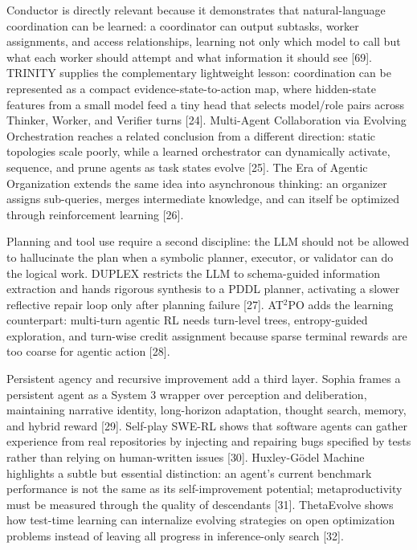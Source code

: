 \documentclass[
  11pt,
]{article}
\begin{document}
Conductor is directly relevant because it demonstrates that
natural-language coordination can be learned: a coordinator can output
subtasks, worker assignments, and access relationships, learning not
only which model to call but what each worker should attempt and what
information it should see {[}69{]}. TRINITY supplies the complementary
lightweight lesson: coordination can be represented as a compact
evidence-state-to-action map, where hidden-state features from a small
model feed a tiny head that selects model/role pairs across Thinker,
Worker, and Verifier turns {[}24{]}. Multi-Agent Collaboration via
Evolving Orchestration reaches a related conclusion from a different
direction: static topologies scale poorly, while a learned orchestrator
can dynamically activate, sequence, and prune agents as task states
evolve {[}25{]}. The Era of Agentic Organization extends the same idea
into asynchronous thinking: an organizer assigns sub-queries, merges
intermediate knowledge, and can itself be optimized through
reinforcement learning {[}26{]}.

Planning and tool use require a second discipline: the LLM should not be
allowed to hallucinate the plan when a symbolic planner, executor, or
validator can do the logical work. DUPLEX restricts the LLM to
schema-guided information extraction and hands rigorous synthesis to a
PDDL planner, activating a slower reflective repair loop only after
planning failure {[}27{]}. AT\(^2\)PO adds the learning counterpart:
multi-turn agentic RL needs turn-level trees, entropy-guided
exploration, and turn-wise credit assignment because sparse terminal
rewards are too coarse for agentic action {[}28{]}.

Persistent agency and recursive improvement add a third layer. Sophia
frames a persistent agent as a System 3 wrapper over perception and
deliberation, maintaining narrative identity, long-horizon adaptation,
thought search, memory, and hybrid reward {[}29{]}. Self-play SWE-RL
shows that software agents can gather experience from real repositories
by injecting and repairing bugs specified by tests rather than relying
on human-written issues {[}30{]}. Huxley-Gödel Machine highlights a
subtle but essential distinction: an agent's current benchmark
performance is not the same as its self-improvement potential;
metaproductivity must be measured through the quality of descendants
{[}31{]}. ThetaEvolve shows how test-time learning can internalize
evolving strategies on open optimization problems instead of leaving all
progress in inference-only search {[}32{]}.
\end{document}
